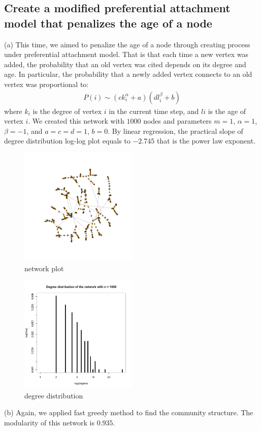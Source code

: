 \documentclass[draftcls,12pt,onecolumn]{IEEEtran}
\begin{document}
\subsection{Create a modified preferential attachment model that penalizes the age of a node}
(a) This time, we aimed to penalize the age of a node through creating process under preferential attachment model. That is that each time a new vertex was added, the probability that an old vertex was cited depends on its degree and age. In particular, the probability that a newly added vertex connects to an old vertex was proportional to:
\begin{align*}
P(i)\sim (c k_{i}^{\alpha }+a)(d l_{i}^{\beta }+b)
\end{align*}
where $k_{i}$ is the degree of vertex $i$ in the current time step, and $li$ is the age of vertex $i$. We created this network with $1000$ nodes and parameters $m = 1$, $\alpha = 1$, $\beta = −1$, and $a = c = d = 1$, $b = 0$. 
By linear regression, the practical slope of degree distribution log-log plot equals to $-2.745$ that is the power law exponent.
\begin{figure}[H]
\centering
\includegraphics[width=0.5\textwidth]{img/3_a_1}
\caption{network plot}
\end{figure}
\begin{figure}[H]
\centering
\includegraphics[width=0.5\textwidth]{img/3_a_2}
\caption{degree distribution}
\end{figure}
(b) Again, we applied fast greedy method to find the community structure. The modularity of this network is $0.935$.
\end{document}
